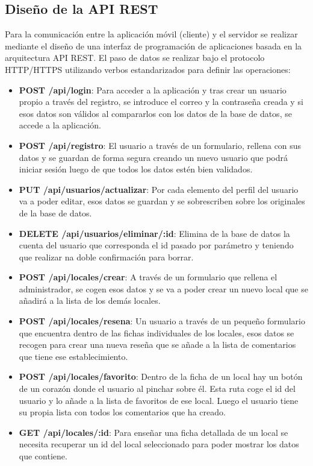\documentclass[a4paper,11pt]{article}
\begin{document}
\subsection{Diseño de la API REST}
Para la comunicación entre la aplicación móvil (cliente) y el servidor se realizar mediante el diseño de una interfaz de programación de aplicaciones basada en la arquitectura API REST. \cite{5} El paso de datos se realizar bajo el protocolo HTTP/HTTPS utilizando verbos estandarizados para definir las operaciones:
\begin{itemize}
    \item \textbf{POST /api/login}: Para acceder a la aplicación y tras crear un usuario propio a través del registro, se introduce el correo y la contraseña creada y si esos datos son válidos al compararlos con los datos de la base de datos, se accede a la aplicación.
    \item \textbf{POST /api/registro}: El usuario a través de un formulario, rellena con sus datos y se guardan de forma segura creando un nuevo usuario que podrá iniciar sesión luego de que todos los datos estén bien validados.
    \item \textbf{PUT /api/usuarios/actualizar}: Por cada elemento del perfil del usuario va a poder editar, esos datos se guardan y se sobrescriben sobre los originales de la base de datos.
    \item \textbf{DELETE /api/usuarios/eliminar/:id}: Elimina de la base de datos la cuenta del usuario que corresponda el id pasado por parámetro y teniendo que realizar na doble confirmación para borrar.
    \item \textbf{POST /api/locales/crear}: A través de un formulario que rellena el administrador, se cogen esos datos y se va a poder crear un nuevo local que se añadirá a la lista de los demás locales.
    \item \textbf{POST /api/locales/resena}: Un usuario a través de un pequeño formulario que encuentra dentro de las fichas individuales de los locales, esos datos se recogen para crear una nueva reseña que se añade a la lista de comentarios que tiene ese establecimiento.
    \item \textbf{POST /api/locales/favorito}: Dentro de la ficha de un local hay un botón de un corazón donde el usuario al pinchar sobre él. Esta ruta coge el id del usuario y lo añade a la lista de favoritos de ese local. Luego el usuario tiene su propia lista con todos los comentarios que ha creado.
    \item \textbf{GET /api/locales/:id}: Para enseñar una ficha detallada de un local se necesita recuperar un id del local seleccionado para poder mostrar los datos que contiene.

\end{itemize}
\end{document}
